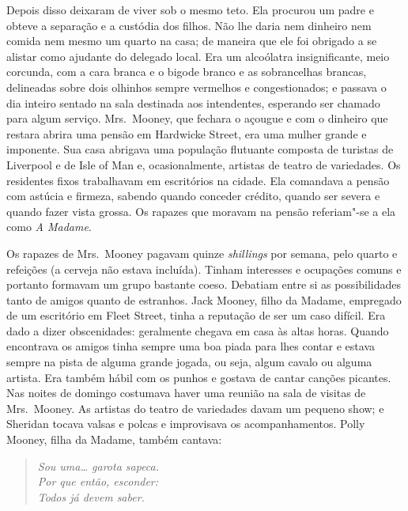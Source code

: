 Depois disso deixaram de viver sob o mesmo teto.  Ela procurou um padre e
obteve a separação e a custódia dos filhos.  Não lhe daria nem dinheiro nem
comida nem mesmo um quarto na casa; de maneira que ele foi obrigado a se
alistar como ajudante do delegado local.  Era um alcoólatra insignificante,
meio corcunda, com a cara branca e o bigode branco e as sobrancelhas brancas,
delineadas sobre dois olhinhos sempre vermelhos e congestionados; e passava o
dia inteiro sentado na sala destinada aos intendentes, esperando ser chamado
para algum serviço.  Mrs.~Mooney, que fechara o açougue e com o dinheiro que
restara abrira uma pensão em Hardwicke Street, era uma mulher grande e
imponente.  Sua casa abrigava uma população flutuante composta de turistas de
Liverpool e de Isle of Man e, ocasionalmente, artistas de teatro de variedades.
Os residentes fixos trabalhavam em escritórios na cidade.  Ela comandava a
pensão com astúcia e firmeza, sabendo quando conceder crédito, quando ser
severa e quando fazer vista grossa.  Os rapazes que moravam na pensão
referiam"-se a ela como \textit{A Madame}.

Os rapazes de Mrs.~Mooney pagavam quinze \textit{shillings} por semana, pelo
quarto e refeições (a cerveja não estava incluída).  Tinham interesses e
ocupações comuns e portanto formavam um grupo bastante coeso.  Debatiam entre
si as possibilidades tanto de amigos quanto de estranhos.  Jack Mooney, filho
da Madame, empregado de um escritório em Fleet Street, tinha a reputação de ser
um caso difícil.  Era dado a dizer obscenidades: geralmente chegava em casa às
altas horas.  Quando encontrava os amigos tinha sempre uma boa piada para lhes
contar e estava sempre na pista de alguma grande jogada, ou seja, algum cavalo
ou alguma artista.  Era também hábil com os punhos e gostava de cantar canções
picantes.  Nas noites de domingo costumava haver uma reunião na sala de visitas
de Mrs.~Mooney.  As artistas do teatro de variedades davam um pequeno show; e
Sheridan tocava valsas e polcas e improvisava os acompanhamentos.  Polly
Mooney, filha da Madame, também cantava:

\begin{verse}\itshape
Sou uma\ldots{} garota sapeca.\\
Por que então, esconder:\\
Todos já devem saber.
\end{verse}

